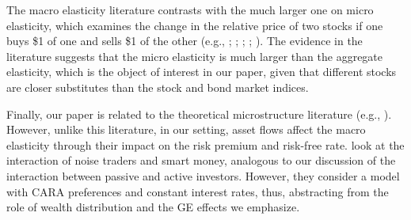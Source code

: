 

The macro elasticity literature contrasts with the much larger one on micro elasticity, which examines the change in the relative price of two stocks if one buys \$1 of one and sells \$1 of the other (e.g., \citealp{Shleifer/1986}; \citealp{Harris/Gurel/1986}; \citealp{chang2015regression}; \citealp{pavlova2021benchmarking}; \citealp{Schmickler/2020}). The evidence in the literature suggests that the micro elasticity is much larger than the aggregate elasticity, which is the object of interest in our paper, given that different stocks are closer substitutes than the stock and bond market indices. 



Finally, our paper is related to the theoretical microstructure literature (e.g., \citealp{Kyle/1985}).  However, unlike this literature, in our setting, asset flows affect the macro elasticity through their impact on the risk premium and risk-free rate. \cite{Campbell/Kyle/1993} look at the interaction of noise traders and smart money, analogous to our discussion of the interaction between passive and active investors. However, they consider a model with CARA preferences and constant interest rates, thus, abstracting from the role of wealth distribution and the GE effects we emphasize.



